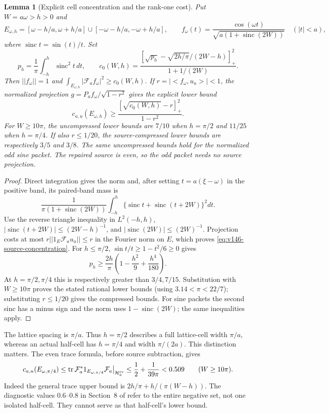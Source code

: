 \documentclass[11pt]{article}
\def\norm#1{||#1||}%
\def\ip#1#2{<#1,#2>}%
\newtheorem{lemma}[theorem]{Lemma}
\theoremstyle{remark}
\newcommand{\norm}[1]{\left\lVert #1\right\rVert}
\newcommand{\ip}[2]{\left\langle #1,#2\right\rangle}
\begin{document}
\begin{lemma}[Explicit cell concentration and the rank-one cost]
\label{lem:v146-packet-concentration}
Put $W=a\omega>h>0$ and
\[
 E_{\omega,h}=[\omega-h/a,\omega+h/a]
                  \cup[-\omega-h/a,-\omega+h/a],\qquad
 f_\omega(t)=\frac{\cos(\omega t)}{\sqrt{a(1+\operatorname{sinc}(2W))}}
                  \quad(|t|<a),
\]
where $\operatorname{sinc}t=\sin(t)/t$. Set
\[
 p_h=\frac1\pi\int_{-h}^h\operatorname{sinc}^2t\,dt,\qquad
 c_0(W,h)=\frac{\left[\sqrt{p_h}
              -\sqrt{2h/\pi}/(2W-h)\right]_+^2}{1+1/(2W)}.
\]
Then $\norm{f_\omega}=1$ and
$\int_{E_{\omega,h}}|\mathcal F_af_\omega|^2\ge c_0(W,h)$.
If $r=|\ip{f_\omega}{u_a}|<1$, the normalized projection
$g=P_af_\omega/\sqrt{1-r^2}$ gives the explicit lower bound
\begin{equation}\label{eq:v146-source-concentration}
 c_{a,u}(E_{\omega,h})\ge
   \frac{[\sqrt{c_0(W,h)}-r]_+^2}{1-r^2}.
\end{equation}
For $W\ge10\pi$, the uncompressed lower bounds are $7/10$ when
$h=\pi/2$ and $11/25$ when $h=\pi/4$. If also $r\le1/20$, the
source-compressed lower bounds are respectively $3/5$ and $3/8$.
The same uncompressed bounds hold for the normalized odd sine packet.
The repaired source is even, so the odd packet needs no source projection.
\end{lemma}
\begin{proof}
Direct integration gives the norm and, after setting
$t=a(\xi-\omega)$ in the positive band, its paired-band mass is
\[
 \frac1{\pi(1+\operatorname{sinc}(2W))}
 \int_{-h}^h\{\operatorname{sinc}t+\operatorname{sinc}(t+2W)\}^2dt.
\]
Use the reverse triangle inequality in $L^2(-h,h)$,
$|\operatorname{sinc}(t+2W)|\le(2W-h)^{-1}$, and
$|\operatorname{sinc}(2W)|\le(2W)^{-1}$. Projection costs at most
$r\norm{1_E\mathcal F_au_a}\le r$ in the Fourier norm on $E$,
which proves \eqref{eq:v146-source-concentration}.
For $h\le\pi/2$, $\sin t/t\ge1-t^2/6\ge0$ gives
\[
 p_h\ge\frac{2h}{\pi}\left(1-\frac{h^2}{9}+\frac{h^4}{180}\right).
\]
At $h=\pi/2,\pi/4$ this is respectively greater than $3/4,7/15$.
Substitution with $W\ge10\pi$ proves the stated rational lower bounds
(using $3.14<\pi<22/7$); substituting $r\le1/20$ gives the compressed
bounds. For sine packets the second sinc has a minus sign and the norm
uses $1-\operatorname{sinc}(2W)$; the same inequalities apply.
\end{proof}

The lattice spacing is $\pi/a$. Thus $h=\pi/2$ describes a full
lattice-cell width $\pi/a$, whereas an actual half-cell has
$h=\pi/4$ and width $\pi/(2a)$. This distinction matters. The even
trace formula, before source subtraction, gives
\begin{equation}\label{eq:v146-halfcell-upper}
 c_{a,u}(E_{\omega,\pi/4})
 \le\operatorname{tr}\mathcal F_a^*1_{E_{\omega,\pi/4}}\mathcal F_a
       \big|_{\mathcal H_a^{\rm ev}}
 \le\frac12+\frac1{39\pi}<0.509\qquad(W\ge10\pi).
\end{equation}
Indeed the general trace upper bound is $2h/\pi+h/(\pi(W-h))$.
The diagnostic values $0.6$--$0.8$ in Section~8 of
 refer to the entire
negative set, not one isolated half-cell. They cannot serve as that
half-cell's lower bound.
\end{document}
